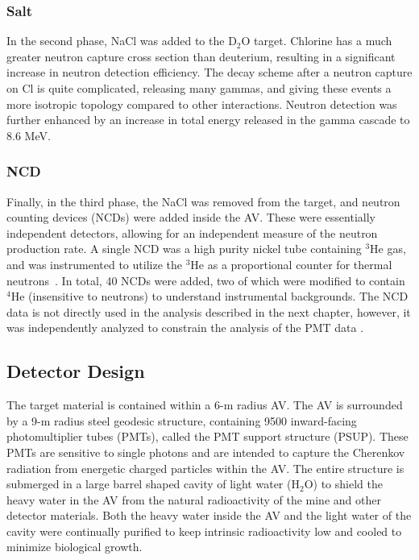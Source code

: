 \subsubsection{Salt}

In the second phase, NaCl was added to the D$_2$O target.
Chlorine has a much greater neutron capture cross section than deuterium, resulting in a significant increase in neutron detection efficiency.
The decay scheme after a neutron capture on Cl is quite complicated, releasing many gammas, and giving these events a more isotropic topology compared to other interactions.
Neutron detection was further enhanced by an increase in total energy released in the gamma cascade to 8.6 MeV.

\subsubsection{NCD}

Finally, in the third phase, the NaCl was removed from the target, and neutron counting devices (NCDs) were added inside the AV.
These were essentially independent detectors, allowing for an independent measure of the neutron production rate.
A single NCD was a high purity nickel tube containing $^3$He gas, and was instrumented to utilize the $^3$He as a proportional counter for thermal neutrons~\cite{ncd}.
In total, 40 NCDs were added, two of which were modified to contain $^4$He (insensitive to neutrons) to understand instrumental backgrounds.
The NCD data is not directly used in the analysis described in the next chapter, however, it was independently analyzed to constrain the analysis of the PMT data \cite{sno_ncd_psa,3phase}.

\subsection{Detector Design}

The target material is contained within a 6-m radius AV.
The AV is surrounded by a 9-m radius steel geodesic structure, containing 9500 inward-facing photomultiplier tubes (PMTs), called the PMT support structure (PSUP).
These PMTs are sensitive to single photons and are intended to capture the Cherenkov radiation from energetic charged particles within the AV.
The entire structure is submerged in a large barrel shaped cavity of light water (H$_2$O) to shield the heavy water in the AV from the natural radioactivity of the mine and other detector materials.
Both the heavy water inside the AV and the light water of the cavity were continually purified to keep intrinsic radioactivity low and cooled to minimize biological growth.

